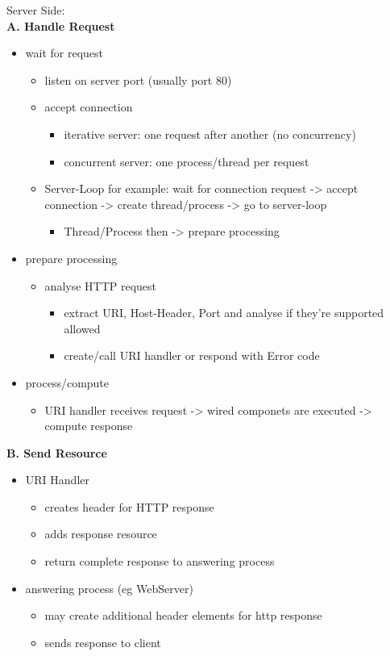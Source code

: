 \documentclass[11pt]{article}
\begin{document}
Server Side:\\
\textbf{A. Handle Request}
\begin{itemize}
\item wait for request
\begin{itemize}
\item listen on server port (usually port 80)
\item accept connection
\begin{itemize}
\item iterative server: one request after another (no concurrency)
\item concurrent server: one process/thread per request
\end{itemize}
\item Server-Loop for example: wait for connection request -> accept connection -> create thread/process -> go to server-loop
\begin{itemize}
\item Thread/Process then -> prepare processing
\end{itemize}
\end{itemize}
\item prepare processing
\begin{itemize}
\item analyse HTTP request
\begin{itemize}
\item extract URI, Host-Header, Port and analyse if they're supported allowed
\item create/call URI handler or respond with Error code
\end{itemize}
\end{itemize}
\item process/compute
\begin{itemize}
\item URI handler receives request -> wired componets are executed -> compute response
\end{itemize}
\end{itemize}
\textbf{B. Send Resource}\\
\begin{itemize}
\item URI Handler
\begin{itemize}
\item creates header for HTTP response
\item adds response resource
\item return complete response to answering process
\end{itemize}
\item answering process (eg WebServer)
\begin{itemize}
\item may create additional header elements for http response
\item sends response to client
\end{itemize}
\end{itemize}
\end{document}
